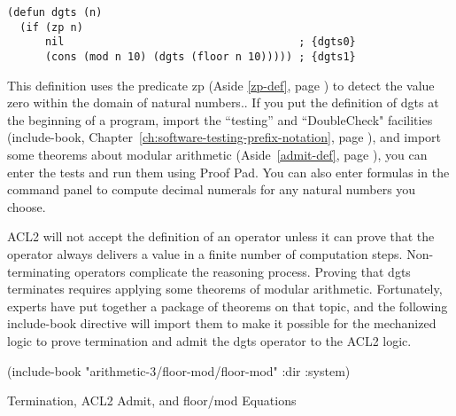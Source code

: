 \label{dgts-defun}
\begin{Verbatim}
(defun dgts (n)
  (if (zp n)
      nil                                     ; {dgts0}
      (cons (mod n 10) (dgts (floor n 10))))) ; {dgts1}
\end{Verbatim}

This definition uses the predicate \textsf{zp}
(Aside \ref{zp-def}, page \pageref{zp-def})
to detect the value zero within the domain of natural numbers..
If you put the definition of \textsf{dgts} at the beginning of a program,
import the ``testing'' and ``DoubleCheck" facilities
(\textsf{include-book},
Chapter~\ref{ch:software-testing-prefix-notation}, page \pageref{ch:software-testing-prefix-notation}),
and import some theorems about modular arithmetic
(Aside~\ref{admit-def}, page \pageref{admit-def}),
you can enter the tests and run them using Proof Pad.
You can also enter formulas in the command panel to compute
decimal numerals for any natural numbers you choose.

\begin{aside}
ACL2 will not accept the definition of
an operator unless
it can prove that the operator always delivers a value in
a finite number of computation steps.
Non-terminating operators complicate the reasoning process.
Proving that \textsf{dgts} terminates
requires applying some theorems of modular arithmetic.
Fortunately, experts have put together a package of theorems on that topic,
and the following \textsf{include-book} directive will import them
to make it possible for the mechanized logic to prove termination
and admit the \textsf{dgts} operator to the ACL2 logic.
\vspace{2mm}
\begin{center}
\textsf{(include-book "arithmetic-3/floor-mod/floor-mod" :dir :system)}
\end{center}
\caption{Termination, ACL2 Admit, and floor/mod Equations}
\label{admit-def}
\label{floor-mod-book}
\label{floor-mod-include-book}
\end{aside}

